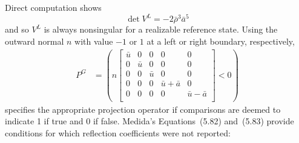 Direct computation shows
\[
  \det V^L = -2\bar{\rho}^3\bar{a}^5
\]
and so $V^L$ is always nonsingular for a realizable reference state.  Using the
outward normal $n$ with value $-1$ or $1$ at a left or right
boundary, respectively,
\begin{align}
\label{eq:PGmedida}
  P^G
  &=
  \left(
  n
  \left[\begin{array}{ccccc}
    \bar{u} & 0       & 0       & 0                 & 0                 \\
    0       & \bar{u} & 0       & 0                 & 0                 \\
    0       & 0       & \bar{u} & 0                 & 0                 \\
    0       & 0       & 0       & \bar{u} + \bar{a} & 0                 \\
    0       & 0       & 0       & 0                 & \bar{u} - \bar{a} \\
  \end{array}\right]
  <
  0
  \right)
\end{align}
specifies the appropriate projection operator if comparisons are deemed to
indicate 1 if true and 0 if false.  Medida's Equations~(5.82) and~(5.83) provide
conditions for which reflection coefficients were not reported:
